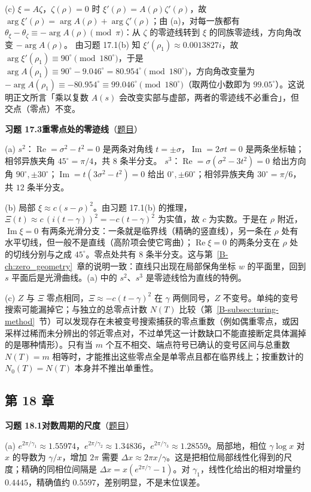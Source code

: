 \documentclass[11pt,a4paper]{article}
\renewcommand{\Re}{\operatorname{Re}}
\renewcommand{\Im}{\operatorname{Im}}
\newcommand{\bref}[1]{\ref*{B-#1}}
\newcommand{\Sol}[2]{%
  \par\addvspace{1.2em}\noindent
  \hypertarget{s:#1}{}\textbf{习题 #1\quad #2}\hfill{\small（\hyperlink{q:#1}{题目}）}\par
  \nopagebreak\smallskip}
\begin{document}
(c) $\xi=A\zeta$，$\zeta(\rho)=0$ 时 $\xi'(\rho)=A(\rho)\zeta'(\rho)$，故 $\arg\xi'(\rho)=\arg A(\rho)+\arg\zeta'(\rho)$；由 (a)，对每一族都有 $\theta_\xi-\theta_\zeta\equiv-\arg A(\rho)\pmod\pi$：从 $\zeta$ 的零迹线转到 $\xi$ 的同族零迹线，方向角改变 $-\arg A(\rho)$。
由习题 17.1(b) 知 $\xi'(\rho_1)\approx0.0013827i$，故 $\arg\xi'(\rho_1)\equiv90^\circ\pmod{180^\circ}$，于是 $\arg A(\rho_1)\equiv90^\circ-9.046^\circ=80.954^\circ\pmod{180^\circ}$，方向角改变量为 $-\arg A(\rho_1)\equiv-80.954^\circ\equiv99.046^\circ\pmod{180^\circ}$（取两位小数即为 $99.05^\circ$）。这说明正文所言「乘以复数 $A(s)$ 会改变实部与虚部，两者的零迹线不必重合」，但交点（零点）不变。

\Sol{17.3}{重零点处的零迹线}
(a) $s^2$：$\Re=\sigma^2-t^2=0$ 是两条对角线 $t=\pm\sigma$，$\Im=2\sigma t=0$ 是两条坐标轴；相邻异族夹角 $45^\circ=\pi/4$，共 $8$ 条半分支。
$s^3$：$\Re=\sigma(\sigma^2-3t^2)=0$ 给出方向角 $90^\circ,\pm30^\circ$；$\Im=t(3\sigma^2-t^2)=0$ 给出 $0^\circ,\pm60^\circ$；相邻异族夹角 $30^\circ=\pi/6$，共 $12$ 条半分支。

(b) 局部 $\xi\approx c(s-\rho)^2$。由习题 17.1(b) 的推理，$\Xi(t)\approx c\,(i(t-\gamma))^2=-c(t-\gamma)^2$ 为实值，故 $c$ 为实数。于是在 $\rho$ 附近，$\Im\xi=0$ 有两条光滑分支：一条就是临界线（精确的竖直线），另一条在 $\rho$ 处有水平切线，但一般不是直线（高阶项会使它弯曲）；$\Re\xi=0$ 的两条分支在 $\rho$ 处的切线分别与之成 $45^\circ$。零点处共有 $8$ 条半分支。这与第~\bref{ch:zero_geometry}~章的说明一致：直线只出现在局部保角坐标 $w$ 的平面里，回到 $s$ 平面后是光滑曲线。(a) 中的 $s^2$、$s^3$ 是零迹线恰为直线的特例。

(c) $Z$ 与 $\Xi$ 零点相同，$\Xi\approx-c(t-\gamma)^2$ 在 $\gamma$ 两侧同号，$Z$ 不变号。单纯的变号搜索可能漏掉它；与独立的总零点计数 $N(T)$ 比较（第~\bref{subsec:turing-method}~节）可以发现存在未被变号搜索捕获的零点重数（例如偶重零点，或因采样过稀而未分辨出的邻近零点对，不过单凭这一计数缺口不能直接断定具体漏掉的是哪种情形）。只有当 $m$ 个互不相交、端点符号已确认的变号区间与总重数 $N(T)=m$ 相等时，才能推出这些零点全是单零点且都在临界线上；按重数计的 $N_0(T)=N(T)$ 本身并不推出单重性。

\subsection*{第 18 章}

\Sol{18.1}{对数周期的尺度}
(a) $e^{2\pi/\gamma_1}\approx1.55974$，$e^{2\pi/\gamma_2}\approx1.34836$，$e^{2\pi/\gamma_3}\approx1.28559$。局部地，相位 $\gamma\log x$ 对 $x$ 的导数为 $\gamma/x$，增加 $2\pi$ 需要 $\Delta x\approx2\pi x/\gamma$。这是把相位局部线性化得到的尺度；精确的同相位间隔是 $\Delta x=x(e^{2\pi/\gamma}-1)$。对 $\gamma_1$，线性化给出的相对增量约 $0.4445$，精确值约 $0.5597$，差别明显，不是末位误差。
\end{document}
